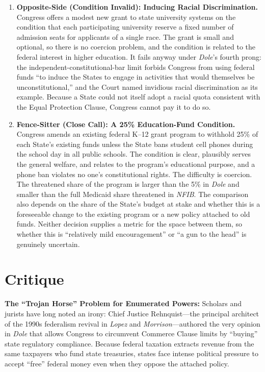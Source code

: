 \documentclass[12pt]{article}
\begin{document}
\begin{enumerate}
\item \textbf{Opposite-Side (Condition Invalid): Inducing Racial Discrimination.} Congress offers a modest new grant to state university systems on the condition that each participating university reserve a fixed number of admission seats for applicants of a single race. The grant is small and optional, so there is no coercion problem, and the condition is related to the federal interest in higher education. It fails anyway under \textit{Dole}'s fourth prong: the independent-constitutional-bar limit forbids Congress from using federal funds ``to induce the States to engage in activities that would themselves be unconstitutional,'' and the Court named invidious racial discrimination as its example. Because a State could not itself adopt a racial quota consistent with the Equal Protection Clause, Congress cannot pay it to do so.

\item \textbf{Fence-Sitter (Close Call): A 25\% Education-Fund Condition.} Congress amends an existing federal K--12 grant program to withhold 25\% of each State's existing funds unless the State bans student cell phones during the school day in all public schools. The condition is clear, plausibly serves the general welfare, and relates to the program's educational purpose, and a phone ban violates no one's constitutional rights. The difficulty is coercion. The threatened share of the program is larger than the 5\% in \textit{Dole} and smaller than the full Medicaid share threatened in \textit{NFIB}. The comparison also depends on the share of the State's budget at stake and whether this is a foreseeable change to the existing program or a new policy attached to old funds. Neither decision supplies a metric for the space between them, so whether this is ``relatively mild encouragement'' or ``a gun to the head'' is genuinely uncertain.

\end{enumerate}

\section{Critique}
\textbf{The ``Trojan Horse'' Problem for Enumerated Powers:} Scholars and jurists have long noted an irony: Chief Justice Rehnquist---the principal architect of the 1990s federalism revival in \textit{Lopez} and \textit{Morrison}---authored the very opinion in \textit{Dole} that allows Congress to circumvent Commerce Clause limits by ``buying'' state regulatory compliance. Because federal taxation extracts revenue from the same taxpayers who fund state treasuries, states face intense political pressure to accept ``free'' federal money even when they oppose the attached policy.
\end{document}
